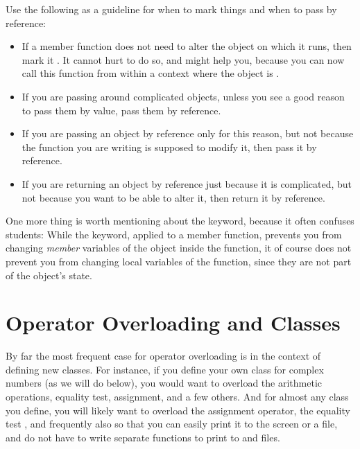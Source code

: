 Use the following as a guideline for when to mark things 
and when to pass by reference:
\begin{itemize}
\item If a member function does not need to alter the object on which
  it runs, then mark it . It cannot hurt to do so,
  and might help you, because you can now call this function from within a
  context where the object is .
\item If you are passing around complicated objects, unless you see a
  good reason to pass them by value, pass them by reference.
\item If you are passing an object by reference only for this reason,
  but not because the function you are writing is supposed to modify it,
  then pass it by  reference.
\item If you are returning an object by reference just because it is
  complicated, but not because you want to be able to alter it,
  then return it by  reference.
\end{itemize}

One more thing is worth mentioning about the  keyword,
because it often confuses students:
While the  keyword, applied to a member function,
prevents you from changing \emph{member} variables of the object
inside the function,
it of course does not prevent you from changing local variables of the
function, since they are not part of the object's state. 

\section{Operator Overloading and Classes}
By far the most frequent case for operator overloading is in the
context of defining new classes.
For instance, if you define your own class for complex numbers (as
we will do below), you would want to overload the arithmetic operations,
equality test, assignment, and a few others.
And for almost any class you define, you will likely want to overload
the assignment operator, the equality test \code{==}, and frequently
also \code{<<} so that you can easily print it to the screen or a file,
and do not have to write separate  functions to
print to  and files.

